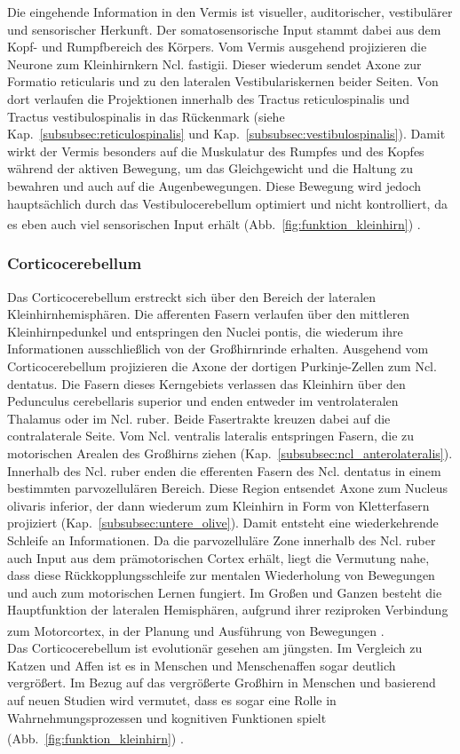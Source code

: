 \documentclass[12pt,a4paper,pdftex]{article}
\begin{document}
Die eingehende Information in den Vermis ist visueller, auditorischer, vestibulärer und sensorischer Herkunft. Der somatosensorische Input stammt dabei aus dem Kopf- und Rumpfbereich des Körpers. Vom Vermis ausgehend projizieren die Neurone zum Kleinhirnkern Ncl. fastigii. Dieser wiederum sendet Axone zur Formatio reticularis und zu den lateralen Vestibulariskernen beider Seiten. Von dort verlaufen die Projektionen innerhalb des Tractus reticulospinalis und Tractus vestibulospinalis in das Rückenmark (siehe Kap.~\ref{subsubsec:reticulospinalis} und Kap.~\ref{subsubsec:vestibulospinalis}). Damit wirkt der Vermis besonders auf die Muskulatur des Rumpfes und des Kopfes während der aktiven Bewegung, um das Gleichgewicht und die Haltung zu bewahren und auch auf die Augenbewegungen. Diese Bewegung wird jedoch hauptsächlich durch das Vestibulocerebellum optimiert und nicht kontrolliert, da es eben auch viel sensorischen Input erhält (Abb.~\ref{fig:funktion_kleinhirn}) \textsuperscript{\cite[42]{kandel2013principles}}.   

\subsubsection*{Corticocerebellum} 
Das Corticocerebellum erstreckt sich über den Bereich der lateralen Kleinhirnhemisphären. Die afferenten Fasern verlaufen über den mittleren Kleinhirnpedunkel und entspringen den Nuclei pontis, die wiederum ihre Informationen ausschließlich von der Großhirnrinde erhalten. Ausgehend vom Corticocerebellum projizieren die Axone der dortigen Purkinje-Zellen zum Ncl. dentatus. Die Fasern dieses Kerngebiets verlassen das Kleinhirn über den Pedunculus cerebellaris superior und enden entweder im ventrolateralen Thalamus oder im Ncl. ruber. Beide Fasertrakte kreuzen dabei auf die contralaterale Seite. Vom Ncl. ventralis lateralis entspringen Fasern, die zu motorischen Arealen des Großhirns ziehen (Kap.~\ref{subsubsec:ncl_anterolateralis}). Innerhalb des Ncl. ruber enden die efferenten Fasern des Ncl. dentatus in einem bestimmten parvozellulären Bereich. Diese Region entsendet Axone zum Nucleus olivaris inferior, der dann wiederum zum Kleinhirn in Form von Kletterfasern projiziert (Kap.~\ref{subsubsec:untere_olive}). Damit entsteht eine wiederkehrende Schleife an Informationen. Da die parvozelluläre Zone innerhalb des Ncl. ruber auch Input aus dem prämotorischen Cortex erhält, liegt die Vermutung nahe, dass diese Rückkopplungsschleife zur mentalen Wiederholung von Bewegungen und auch zum motorischen Lernen fungiert. Im Großen und Ganzen besteht die Hauptfunktion der lateralen Hemisphären, aufgrund ihrer reziproken Verbindung zum Motorcortex, in der Planung und Ausführung von Bewegungen \textsuperscript{\cite[42]{kandel2013principles}}.\\
Das Corticocerebellum ist evolutionär gesehen am jüngsten. Im Vergleich zu Katzen und Affen ist es in Menschen und Menschenaffen sogar deutlich vergrößert. Im Bezug auf das vergrößerte Großhirn in Menschen und basierend auf neuen Studien wird vermutet, dass es sogar eine Rolle in Wahrnehmungsprozessen und kognitiven Funktionen spielt (Abb.~\ref{fig:funktion_kleinhirn}) \textsuperscript{\cite[42]{kandel2013principles}}. 
\end{document}
